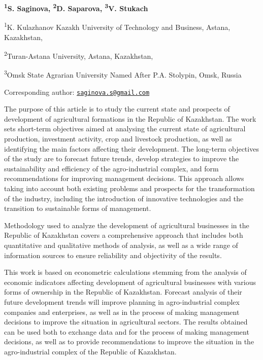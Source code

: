 


\begin{articleheader}

{\bfseries \textsuperscript{1}S. Saginova\textsuperscript{\envelope },
\textsuperscript{2}D. Saparova, \textsuperscript{3}V. Stukach}
\end{articleheader}
\begin{affiliation}

\textsuperscript{1}K. Kulazhanov Kazakh University of Technology and
Business, Astana, Kazakhstan,

\textsuperscript{2}Turan-Astana University, Astana, Kazakhstan,

\textsuperscript{3}Omsk State Agrarian University Named After P.A.
Stolypin, Omsk, Russia

\raggedright{\bfseries \textsuperscript{\envelope }}Corresponding author:
\href{mailto:saginova.s@gmail.com}{\nolinkurl{saginova.s@gmail.com}}
\end{affiliation}

The purpose of this article is to study the current state and prospects
of development of agricultural formations in the Republic of Kazakhstan.
The work sets short-term objectives aimed at analysing the current state
of agricultural production, investment activity, crop and livestock
production, as well as identifying the main factors affecting their
development. The long-term objectives of the study are to forecast
future trends, develop strategies to improve the sustainability and
efficiency of the agro-industrial complex, and form recommendations for
improving management decisions. This approach allows taking into account
both existing problems and prospects for the transformation of the
industry, including the introduction of innovative technologies and the
transition to sustainable forms of management.

Methodology used to analyze the development of agricultural businesses
in the Republic of Kazakhstan covers a comprehensive approach that
includes both quantitative and qualitative methods of analysis, as well
as a wide range of information sources to ensure reliability and
objectivity of the results.

This work is based on econometric calculations stemming from the
analysis of economic indicators affecting development of agricultural
businesses with various forms of ownership in the Republic of
Kazakhstan. Forecast analysis of their future development trends will
improve planning in agro-industrial complex companies and enterprises,
as well as in the process of making management decisions to improve the
situation in agricultural sectors. The results obtained can be used both
to exchange data and for the process of making management decisions, as
well as to provide recommendations to improve the situation in the
agro-industrial complex of the Republic of Kazakhstan.

